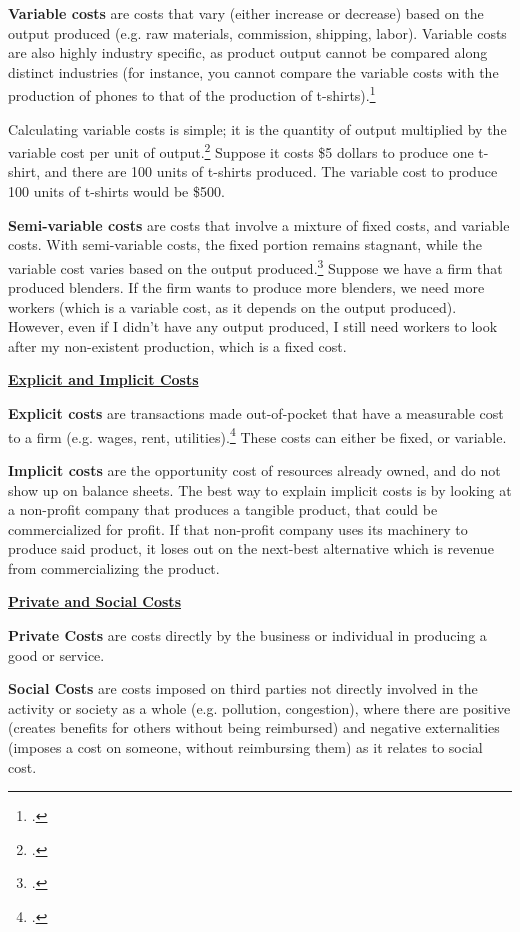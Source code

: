 \textbf{Variable costs} are costs that vary (either increase or decrease) based on the output produced (e.g. raw materials, commission, shipping, labor). Variable costs are also highly industry specific, as product output cannot be compared along distinct industries (for instance, you cannot compare the variable costs with the production of phones to that of the production of t-shirts).\footcite{nickolas_2025_variable}

Calculating variable costs is simple; it is the quantity of output multiplied by the variable cost per unit of output.\footcite{nickolas_2025_variable} Suppose it costs \$5 dollars to produce one t-shirt, and there are 100 units of t-shirts produced. The variable cost to produce 100 units of t-shirts would be \$500.

\textbf{Semi-variable costs} are costs that involve a mixture of fixed costs, and variable costs. With semi-variable costs, the fixed portion remains stagnant, while the variable cost varies based on the output produced.\footcite{tuovila_2022_semivariable} Suppose we have a firm that produced blenders. If the firm wants to produce more blenders, we need more workers (which is a variable cost, as it depends on the output produced). However, even if I didn't have any output produced, I still need workers to look after my non-existent production, which is a fixed cost.



\underline{\textbf{Explicit and Implicit Costs}}

\textbf{Explicit costs} are transactions made out-of-pocket that have a measurable cost to a firm (e.g. wages, rent, utilities).\footcite{pettinger_2020_the} These costs can either be fixed, or variable.

\textbf{Implicit costs} are the opportunity cost of resources already owned, and do not show up on balance sheets. The best way to explain implicit costs is by looking at a non-profit company that produces a tangible product, that could be commercialized for profit. If that non-profit company uses its machinery to produce said product, it loses out on the next-best alternative which is revenue from commercializing the product.

\underline{\textbf{Private and Social Costs}}

\textbf{Private Costs} are costs directly by the business or individual in producing a good or service.

\textbf{Social Costs} are costs imposed on third parties not directly involved in the activity or society as a whole (e.g. pollution, congestion), where there are positive (creates benefits for others without being reimbursed) and negative externalities (imposes a cost on someone, without reimbursing them) as it relates to social cost.


